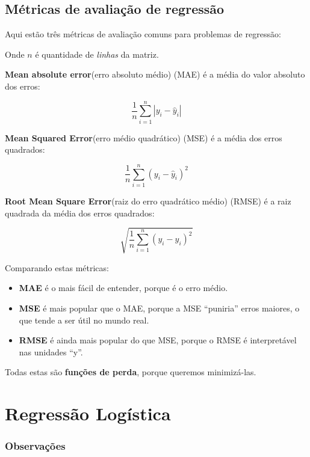 \documentclass[12pt]{article}
\providecommand{\tightlist}{%
\setlength{\itemsep}{0pt}\setlength{\parskip}{0pt}}
\begin{document}
    \hypertarget{muxe9tricas-de-avaliauxe7uxe3o-de-regressuxe3o}{%
\subsection{Métricas de avaliação de
regressão}\label{muxe9tricas-de-avaliauxe7uxe3o-de-regressuxe3o}}

Aqui estão três métricas de avaliação comuns para problemas de
regressão:

Onde \(n\) é quantidade de \emph{linhas} da matriz.

\textbf{Mean absolute error}(erro absoluto médio) (MAE) é a média do
valor absoluto dos erros:

\[\frac 1n\sum_{i=1}^n|y_i-\hat{y}_i|\]

\textbf{Mean Squared Error}(erro médio quadrático) (MSE) é a média dos
erros quadrados:

\[\frac 1n\sum_{i=1}^n(y_i-\hat{y}_i)^2\]

\textbf{Root Mean Square Error}(raiz do erro quadrático médio) (RMSE) é
a raiz quadrada da média dos erros quadrados:

\[\sqrt{\frac 1n\sum_{i=1}^n(y_i-\hat{y}_i)^2}\]

Comparando estas métricas:

\begin{itemize}
\tightlist
\item
  \textbf{MAE} é o mais fácil de entender, porque é o erro médio.
\item
  \textbf{MSE} é mais popular que o MAE, porque a MSE ``puniria'' erros
  maiores, o que tende a ser útil no mundo real.
\item
  \textbf{RMSE} é ainda mais popular do que MSE, porque o RMSE é
  interpretável nas unidades ``y''.
\end{itemize}

Todas estas são \textbf{funções de perda}, porque queremos minimizá-las.

\hypertarget{regressuxe3o-loguxedstica}{%
\section{\texorpdfstring{\textbf{Regressão
Logística}}{Regressão Logística}}\label{regressuxe3o-loguxedstica}}

\hypertarget{observauxe7uxf5es}{%
\subsubsection{Observações}\label{observauxe7uxf5es}}
\end{document}
